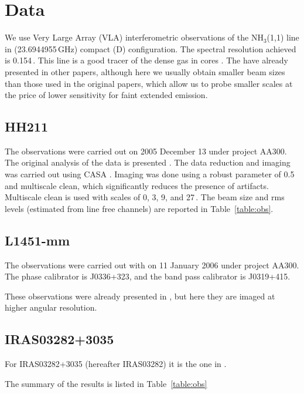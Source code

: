 \section{Data}

We use Very Large Array (VLA) interferometric observations of the NH$_3$(1,1) line in (23.6944955\,GHz)
compact (D) configuration. 
The spectral resolution achieved is 0.154\,\kms. 
This line is a good tracer of the dense gas in cores \cite{Benson_1989,Goodman_1998,Tafalla_2004,Pineda_2010}.
The have already presented in other papers, although here we usually obtain smaller beam sizes than those 
used in the original papers, which allow us to probe smaller scales at the 
price of lower sensitivity for faint extended emission.

\subsection{HH211}
The observations were carried out on 2005 December 13 under project AA300. 
The original analysis of the data is presented \cite{Tanner_2010}.
The data reduction and imaging was carried out using CASA \cite{2007ASPC..376..127M}. 
Imaging was done using a robust parameter of 0.5 and multiscale clean, which significantly reduces 
the presence of artifacts. 
Multiscale clean is used with scales of 0, 3, 9, and 27\,\arcsec. 
The beam size and rms levels (estimated from line free channels) are reported in Table~\ref{table:obs}.

\subsection{L1451-mm}
The observations were carried out with on 11 January 2006 under project AA300. 
The phase calibrator is J0336+323, and the band pass calibrator is J0319+415.

These observations were already presented in \cite{Pineda_2011}, but here they are 
imaged at higher angular resolution.

\subsection{IRAS03282+3035}
For IRAS03282+3035 (hereafter IRAS03282) it is the one in \cite{Tobin_2011}. 

The summary of the results is listed in Table~\ref{table:obs}

